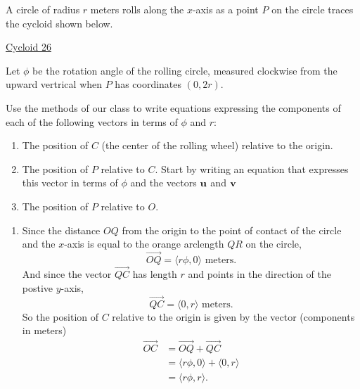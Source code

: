 \documentclass{ximera}
\begin{document}
\begin{question} \label{Qvm93}
 A circle of radius $r$ meters rolls along the $x$-axis as a point $P$ on the circle traces the cycloid shown below. 

\begin{onlineOnly}
    \begin{center}
\end{center}
\end{onlineOnly}

\href{https://www.desmos.com/calculator/lebi7kyoac}{Cycloid 26}



Let $\phi$ be the rotation angle of the rolling circle, measured clockwise from the upward vertrical when $P$ has coordinates $(0,2r)$.

 Use the methods of our class to write equations expressing the components of each of the following vectors in terms of $\phi$ and $r$:
\begin{enumerate}

\item The position of $C$ (the center of the rolling wheel) relative to the origin.

\item The position of $P$ relative to $C$. Start by writing an equation that expresses this vector in terms of $\phi$ and the vectors ${\bf u}$ and ${\bf v}$

\item The position of $P$ relative to $O$.
\end{enumerate}

\begin{explanation}
\begin{enumerate}
\item Since the distance $OQ$ from the origin to the point of contact of the circle and the $x$-axis is equal to the orange arclength $QR$ on the circle,
\[
  \overrightarrow{OQ} = \langle r \phi, 0 \rangle \text{ meters}.
\]
And since the vector $\overrightarrow{QC}$ has length $r$ and points in the direction of the postive $y$-axis,
\[
 \overrightarrow{QC} = \langle 0 , r \rangle \text{ meters}.
\]
So the position of $C$ relative to the origin is given by the vector (components in meters)
\begin{align*}
      \overrightarrow{OC} &= \overrightarrow{OQ} + \overrightarrow{QC} \\
                                    &= \langle r \phi, 0 \rangle + \langle 0 , r \rangle \\
                                    &= \langle r \phi , r \rangle.
\end{align*}


\end{enumerate}
\end{explanation}
\end{question}
\end{document}
